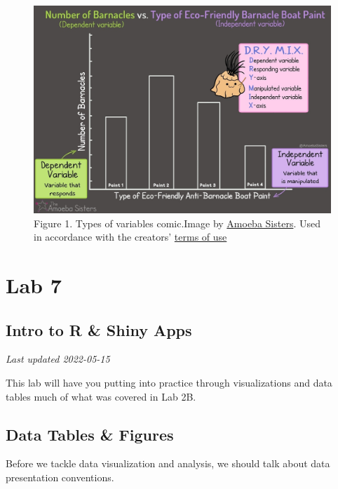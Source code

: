 \documentclass[
]{book}
\begin{document}
\begin{figure}
\centering
\includegraphics{figures_images/Lab6-Fig1.jpg}
\caption{Figure 1. Types of variables comic.Image by \href{https://www.amoebasisters.com/parameciumparlorcomics/category/nature-of-science/2}{Amoeba Sisters}. Used in accordance with the creators' \href{https://www.amoebasisters.com/termsofuse.html}{terms of use}}
\end{figure}

\hypertarget{part-lab-7}{%
\part*{Lab 7}\label{part-lab-7}}

\hypertarget{intro-to-r-shiny-apps}{%
\chapter*{Intro to R \& Shiny Apps}\label{intro-to-r-shiny-apps}}

\emph{Last updated 2022-05-15}

This lab will have you putting into practice through visualizations and data tables much of what was covered in Lab 2B.

\hypertarget{data-tables-figures}{%
\chapter*{Data Tables \& Figures}\label{data-tables-figures}}

Before we tackle data visualization and analysis, we should talk about data presentation conventions.
\end{document}
